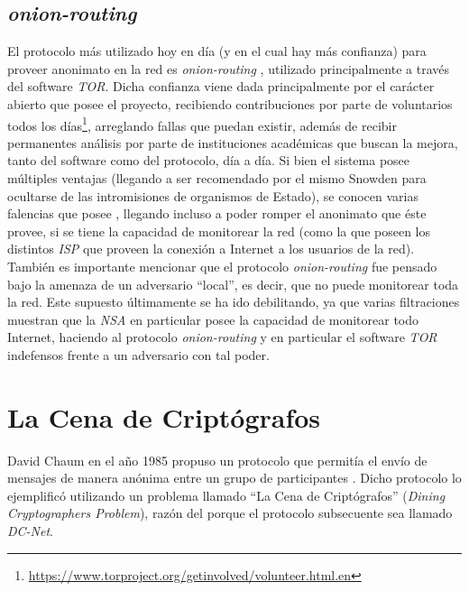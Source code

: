\subsection{\emph{onion-routing}}

El protocolo más utilizado hoy en día (y en el cual hay más confianza) para proveer anonimato en la red es \emph{onion-routing} \cite{reed1998anonymous}, utilizado principalmente a través del software \emph{TOR}. Dicha confianza viene dada principalmente por el carácter abierto que posee el proyecto, recibiendo contribuciones por parte de voluntarios todos los días\footnote{\url{https://www.torproject.org/getinvolved/volunteer.html.en}}, arreglando fallas que puedan existir, además de recibir permanentes análisis por parte de instituciones académicas que buscan la mejora, tanto del software como del protocolo, día a día. Si bien el sistema posee múltiples ventajas (llegando a ser recomendado por el mismo Snowden para ocultarse de las intromisiones de organismos de Estado), se conocen varias falencias que posee \cite{wright2002analysis}, llegando incluso a poder romper el anonimato que éste provee, si se tiene la capacidad de monitorear la red (como la que poseen los distintos \emph{ISP} que proveen la conexión a Internet a los usuarios de la red). También es importante mencionar que el protocolo \emph{onion-routing} fue pensado bajo la amenaza de un adversario ``local'', es decir, que no puede monitorear toda la red. Este supuesto últimamente se ha ido debilitando, ya que varias filtraciones muestran que la \emph{NSA} en particular posee la capacidad de monitorear todo Internet, haciendo al protocolo \emph{onion-routing} y en particular el software \emph{TOR} indefensos frente a un adversario con tal poder.

\section{La Cena de Criptógrafos}

David Chaum en el año 1985 propuso un protocolo que permitía el envío de mensajes de manera anónima entre un grupo de participantes \cite{Chaum:1985:SWI:4372.4373, chaum1988dining}. Dicho protocolo lo ejemplificó utilizando un problema llamado ``La Cena de Criptógrafos'' (\emph{Dining Cryptographers Problem}), razón del porque el protocolo subsecuente sea llamado \emph{DC-Net}.

